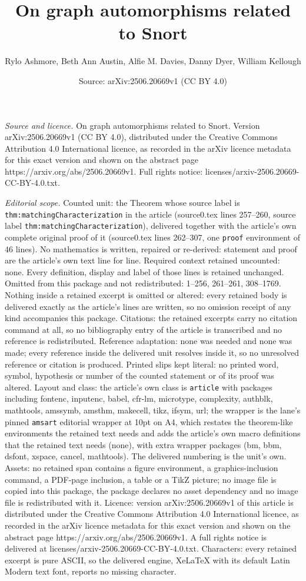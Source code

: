 \documentclass[10pt,a4paper]{amsart}
\title[On graph automorphisms related to Snort]{On graph automorphisms related to Snort}
\author{Rylo Ashmore, Beth Ann Austin, Alfie M. Davies, Danny Dyer, William Kellough}
\date{Source: arXiv:2506.20669v1 (CC BY 4.0)}
\begin{document}
\maketitle

\noindent\emph{Source and licence.} On graph automorphisms related to Snort. Version arXiv:2506.20669v1 (CC BY 4.0), distributed under the Creative Commons Attribution 4.0 International licence, as recorded in the arXiv licence metadata for this exact version and shown on the abstract page https://arxiv.org/abs/2506.20669v1. Full rights notice: licenses/arxiv-2506.20669-CC-BY-4.0.txt.\par\smallskip

\noindent\textit{Editorial scope.} Counted unit: the Theorem whose source label is \texttt{thm:matchingCharacterization} in the article (source0.tex lines 257--260, source label \texttt{thm:matchingCharacterization}), delivered together with the article's own complete original proof of it (source0.tex lines 262--307, one \texttt{proof} environment of 46 lines). No mathematics is written, repaired or re-derived: statement and proof are the article's own text line for line. Required context retained uncounted: none. Every definition, display and label of those lines is retained unchanged. Omitted from this package and not redistributed: 1--256, 261--261, 308--1769. Nothing inside a retained excerpt is omitted or altered: every retained body is delivered exactly as the article's lines are written, so no omission receipt of any kind accompanies this package. Citations: the retained excerpts carry no citation command at all, so no bibliography entry of the article is transcribed and no reference is redistributed. Reference adaptation: none was needed and none was made; every reference inside the delivered unit resolves inside it, so no unresolved reference or citation is produced. Printed slips kept literal: no printed word, symbol, hypothesis or number of the counted statement or of its proof was altered. Layout and class: the article's own class is \texttt{article} with packages including fontenc, inputenc, babel, cfr-lm, microtype, complexity, authblk, mathtools, amssymb, amsthm, makecell, tikz, ifsym, url; the wrapper is the lane's pinned \texttt{amsart} editorial wrapper at 10pt on A4, which restates the theorem-like environments the retained text needs and adds the article's own macro definitions that the retained text needs (none), with extra wrapper packages (bm, bbm, dsfont, xspace, cancel, mathtools). The delivered numbering is the unit's own. Assets: no retained span contains a figure environment, a graphics-inclusion command, a PDF-page inclusion, a table or a TikZ picture; no image file is copied into this package, the package declares no asset dependency and no image file is redistributed with it. Licence: version arXiv:2506.20669v1 of this article is distributed under the Creative Commons Attribution 4.0 International licence, as recorded in the arXiv licence metadata for this exact version and shown on the abstract page https://arxiv.org/abs/2506.20669v1. A full rights notice is delivered at licenses/arxiv-2506.20669-CC-BY-4.0.txt. Characters: every retained excerpt is pure ASCII, so the delivered engine, XeLaTeX with its default Latin Modern text font, reports no missing character.
\end{document}
